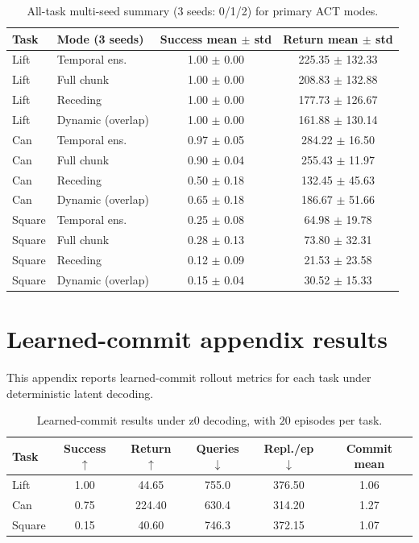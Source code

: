 \documentclass{article}
\begin{document}
\begin{table}[H]
\centering
\small
\begin{tabular}{@{}llcc@{}}
\toprule
Task & Mode (3 seeds) & Success mean $\pm$ std & Return mean $\pm$ std \\
\midrule
Lift & Temporal ens. & 1.00 $\pm$ 0.00 & 225.35 $\pm$ 132.33 \\
Lift & Full chunk & 1.00 $\pm$ 0.00 & 208.83 $\pm$ 132.88 \\
Lift & Receding & 1.00 $\pm$ 0.00 & 177.73 $\pm$ 126.67 \\
Lift & Dynamic (overlap) & 1.00 $\pm$ 0.00 & 161.88 $\pm$ 130.14 \\
\midrule
Can & Temporal ens. & 0.97 $\pm$ 0.05 & 284.22 $\pm$ 16.50 \\
Can & Full chunk & 0.90 $\pm$ 0.04 & 255.43 $\pm$ 11.97 \\
Can & Receding & 0.50 $\pm$ 0.18 & 132.45 $\pm$ 45.63 \\
Can & Dynamic (overlap) & 0.65 $\pm$ 0.18 & 186.67 $\pm$ 51.66 \\
\midrule
Square & Temporal ens. & 0.25 $\pm$ 0.08 & 64.98 $\pm$ 19.78 \\
Square & Full chunk & 0.28 $\pm$ 0.13 & 73.80 $\pm$ 32.31 \\
Square & Receding & 0.12 $\pm$ 0.09 & 21.53 $\pm$ 23.58 \\
Square & Dynamic (overlap) & 0.15 $\pm$ 0.04 & 30.52 $\pm$ 15.33 \\
\bottomrule
\end{tabular}
\caption{All-task multi-seed summary ($3$ seeds: 0/1/2) for primary ACT modes.}
\label{tab:seed_all_tasks}
\end{table}

\section{Learned-commit appendix results}
This appendix reports learned-commit rollout metrics for each task under deterministic latent decoding.

\begin{table}[H]
\centering
\small
\begin{tabular}{@{}lccccc@{}}
\toprule
Task & Success $\uparrow$ & Return $\uparrow$ & Queries $\downarrow$ & Repl./ep $\downarrow$ & Commit mean \\
\midrule
Lift & 1.00 & 44.65 & 755.0 & 376.50 & 1.06 \\
Can & 0.75 & 224.40 & 630.4 & 314.20 & 1.27 \\
Square & 0.15 & 40.60 & 746.3 & 372.15 & 1.07 \\
\bottomrule
\end{tabular}
\caption{Learned-commit results under z0 decoding, with $20$ episodes per task.}
\label{tab:learned_commit}
\end{table}
\end{document}
